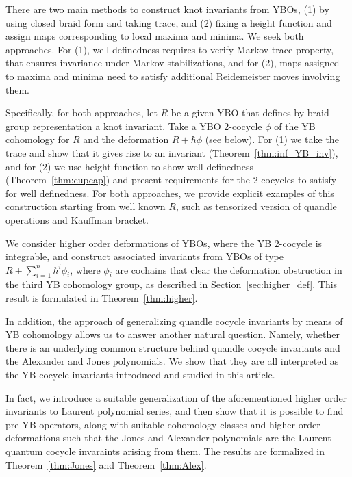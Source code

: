 \documentclass[11pt,fleqn]{amsart} %
\begin{document}
There are two main methods to construct knot invariants from YBOs, (1) by using closed braid form and taking trace,
and (2) fixing a height function and assign maps corresponding to local maxima and minima.
We seek both approaches. For (1), well-definedness requires to verify Markov trace property, that ensures invariance under Markov stabilizations, and for (2), maps assigned to maxima and minima need to satisfy additional Reidemeister moves 
involving them. 

Specifically, for both approaches, let $R$ be a given YBO that defines by braid group representation a knot invariant. Take a YBO 2-cocycle $\phi$ of the YB cohomology for $R$ and the deformation $R+\hbar \phi$ (see below). For (1) we take the trace and show that it gives rise to an invariant (Theorem~\ref{thm:inf_YB_inv}), and for (2) we use height function to show well definedness (Theorem~\ref{thm:cupcap}) and present requirements for the 2-cocycles to satisfy for well definedness.
For both approaches, we provide explicit examples of this construction starting from well known $R$, such as tensorized version of quandle operations and Kauffman bracket. 

	We consider higher order deformations of YBOs, where the YB $2$-cocycle is integrable, and construct associated invariants from YBOs of type $R+ \sum_{i=1}^n\hbar^i \phi_i$, where $\phi_i$ are cochains that clear the deformation obstruction in the third YB cohomology group, as described in Section~\ref{sec:higher_def}. This result is formulated in Theorem~\ref{thm:higher}. 

In addition, the approach of generalizing quandle cocycle invariants by means of YB cohomology allows us to answer another natural question. Namely, whether there is an underlying common structure behind quandle cocycle invariants and the Alexander and Jones polynomials. We show that they are all interpreted as the YB cocycle invariants introduced and studied in this article. 

	In fact, we introduce a suitable generalization of the aforementioned higher order invariants to Laurent polynomial series, and then show that it is possible to find pre-YB operators, along with suitable cohomology classes and higher order deformations such that the Jones and Alexander polynomials are the Laurent quantum cocycle invaraints arising from them. The results are formalized in Theorem~\ref{thm:Jones} and Theorem~\ref{thm:Alex}. 
\end{document}
